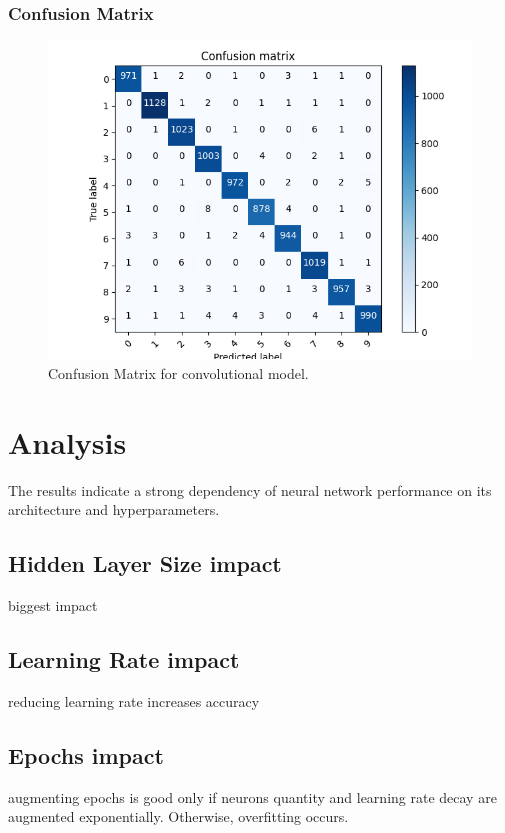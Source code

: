 \documentclass{article}
\begin{document}
\subsubsection{Confusion Matrix}
\begin{figure}
    \centering
    \includegraphics[width=\textwidth]{media/convolution/Figure_1.png}
    \caption{Confusion Matrix for convolutional model.}
    \label{fig:convolution_confusion}
\end{figure}

\section{Analysis}
The results indicate a strong dependency of 
neural network performance on its 
architecture and 
hyperparameters. 
\subsection{Hidden Layer Size impact}
biggest impact
\subsection{Learning Rate impact}
reducing learning rate increases accuracy
\subsection{Epochs impact}
augmenting epochs is good only if neurons quantity and learning rate decay are augmented exponentially.
Otherwise, overfitting occurs.
\end{document}
